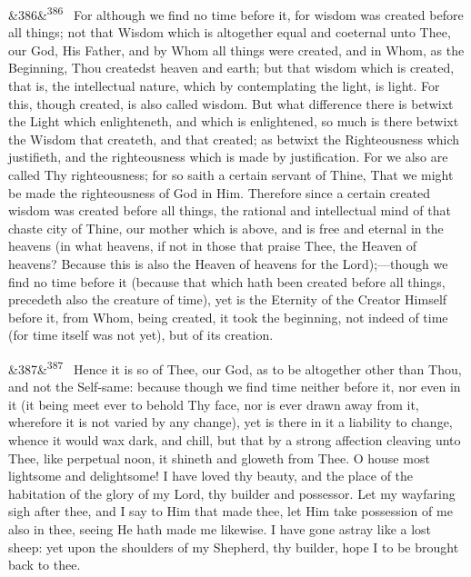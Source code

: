 \documentclass[12pt]{article}
\newcommand{\para}[1][]{\par\noindent\ifx&#1&\else\textsuperscript{\footnotesize #1}~\fi}
\begin{document}
\para[386] For although we find no time before it, for wisdom was created before all things; not that Wisdom which is altogether equal and coeternal unto Thee, our God, His Father, and by Whom all things were created, and in Whom, as the Beginning, Thou createdst heaven and earth; but that wisdom which is created, that is, the intellectual nature, which by contemplating the light, is light. For this, though created, is also called wisdom. But what difference there is betwixt the Light which enlighteneth, and which is enlightened, so much is there betwixt the Wisdom that createth, and that created; as betwixt the Righteousness which justifieth, and the righteousness which is made by justification. For we also are called Thy righteousness; for so saith a certain servant of Thine, That we might be made the righteousness of God in Him. Therefore since a certain created wisdom was created before all things, the rational and intellectual mind of that chaste city of Thine, our mother which is above, and is free and eternal in the heavens (in what heavens, if not in those that praise Thee, the Heaven of heavens? Because this is also the Heaven of heavens for the Lord);---though we find no time before it (because that which hath been created before all things, precedeth also the creature of time), yet is the Eternity of the Creator Himself before it, from Whom, being created, it took the beginning, not indeed of time (for time itself was not yet), but of its creation.

\para[387] Hence it is so of Thee, our God, as to be altogether other than Thou, and not the Self-same: because though we find time neither before it, nor even in it (it being meet ever to behold Thy face, nor is ever drawn away from it, wherefore it is not varied by any change), yet is there in it a liability to change, whence it would wax dark, and chill, but that by a strong affection cleaving unto Thee, like perpetual noon, it shineth and gloweth from Thee. O house most lightsome and delightsome! I have loved thy beauty, and the place of the habitation of the glory of my Lord, thy builder and possessor. Let my wayfaring sigh after thee, and I say to Him that made thee, let Him take possession of me also in thee, seeing He hath made me likewise. I have gone astray like a lost sheep: yet upon the shoulders of my Shepherd, thy builder, hope I to be brought back to thee.
\end{document}
